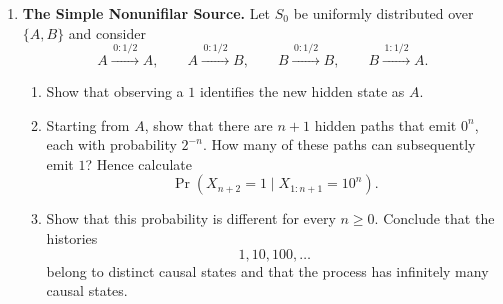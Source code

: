 \documentclass[11pt]{article}
\begin{document}
\begin{exercise}
\begin{enumerate}
      \begin{enumerate}
        \item For each of the length-one histories $0$ and $1$, determine
          whether the current hidden state can be identified exactly.

        \item Starting from each ambiguous history in part (i), consider its
          possible one-symbol extensions. Which extensions resolve the
          ambiguity, and which remain ambiguous? You may use the fact that
          $\epsilon(\emptyset)=\epsilon(11)$. What does this imply for
          histories of the form $1^n$?

        \item Assume additionally that
          $\epsilon(\emptyset)\neq\epsilon(1)$. Show that the causal states
          have shortest representatives
          \[
            \emptyset,\qquad 1,\qquad 0,\qquad 01,
          \]
          and explain why there are no additional causal states. You may
          distinguish causal states using possible and impossible future
          continuations.

        \item Using $\epsilon(\emptyset)=\epsilon(11)$ and assuming
          $\epsilon(\emptyset)\neq\epsilon(1)$, draw the automaton associated
          with the causal-state dynamics.
      \end{enumerate}

    \item \textbf{The Simple Nonunifilar Source.}
      Let $S_0$ be uniformly distributed over $\{A,B\}$ and consider
      \[
        A\xrightarrow{\,0:1/2\,}A,
        \qquad
        A\xrightarrow{\,0:1/2\,}B,
        \qquad
        B\xrightarrow{\,0:1/2\,}B,
        \qquad
        B\xrightarrow{\,1:1/2\,}A.
      \]

      \begin{enumerate}
        \item Show that observing a $1$ identifies the new hidden state as
          $A$.

        \item Starting from $A$, show that there are $n+1$ hidden paths that
          emit $0^n$, each with probability $2^{-n}$. How many of these paths
          can subsequently emit $1$? Hence calculate
          \[
            \Pr(X_{n+2}=1\mid X_{1:n+1}=10^n).
          \]

        \item Show that this probability is different for every $n\geq0$.
          Conclude that the histories
          \[
            1,10,100,\ldots
          \]
          belong to distinct causal states and that the process has infinitely
          many causal states.
      \end{enumerate}
  \end{enumerate}
\end{exercise}
\end{document}
